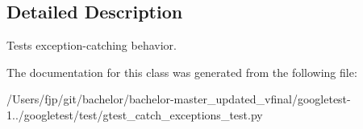 \subsection{Detailed Description}
\begin{DoxyVerb}Tests exception-catching behavior.\end{DoxyVerb}
 

The documentation for this class was generated from the following file\+:\begin{DoxyCompactItemize}
\item 
/\+Users/fjp/git/bachelor/bachelor-\/master\+\_\+updated\+\_\+vfinal/googletest-\/1../googletest/test/gtest\+\_\+catch\+\_\+exceptions\+\_\+test.\+py\end{DoxyCompactItemize}
